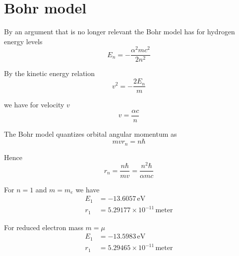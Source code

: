 


\section*{Bohr model}

By an argument that is no longer relevant the Bohr model
has for hydrogen energy levels
\begin{equation*}
E_n=-\frac{\alpha^2mc^2}{2n^2}
\end{equation*}

By the kinetic energy relation
\begin{equation*}
v^2=-\frac{2E_n}{m}
\end{equation*}

we have for velocity $v$
\begin{equation*}
v=\frac{\alpha c}{n}
\end{equation*}

The Bohr model quantizes orbital angular momentum as
\begin{equation*}
mvr_n=n\hbar
\end{equation*}

Hence
\begin{equation*}
r_n=\frac{n\hbar}{mv}=\frac{n^2\hbar}{\alpha mc}
\end{equation*}

For $n=1$ and $m=m_e$ we have
\begin{align*}
E_1&=-13.6057\,\text{eV}
\\
r_1&=5.29177\times10^{-11}\,\text{meter}
\end{align*}

For reduced electron mass $m=\mu$
\begin{align*}
E_1&=-13.5983\,\text{eV}
\\
r_1&=5.29465\times10^{-11}\,\text{meter}
\end{align*}


